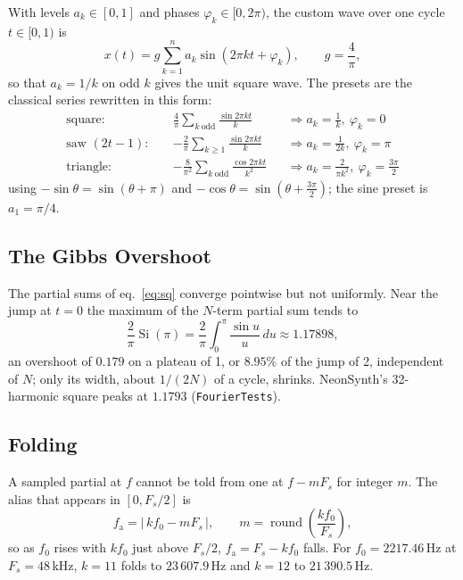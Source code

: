 \documentclass[11pt,letterpaper]{article}
\newcommand{\code}[1]{\texttt{\textcolor{codegray}{#1}}}
\begin{document}
With levels $a_k \in [0,1]$ and phases $\varphi_k \in [0, 2\pi)$, the custom wave over one cycle $t \in [0,1)$ is
\begin{equation}\label{eq:series}
  x(t) = g \sum_{k=1}^{n} a_k \sin(2\pi k t + \varphi_k), \qquad g = \frac{4}{\pi},
\end{equation}
so that $a_k = 1/k$ on odd $k$ gives the unit square wave. The presets are the classical series rewritten in this form:
\begin{align}
  \text{square:}\quad & \frac{4}{\pi}\sum_{k\ \mathrm{odd}} \frac{\sin 2\pi k t}{k} &&\Rightarrow a_k = \frac{1}{k},\ \varphi_k = 0 \label{eq:sq}\\
  \text{saw } (2t-1):\quad & -\frac{2}{\pi}\sum_{k\ge 1} \frac{\sin 2\pi k t}{k} &&\Rightarrow a_k = \frac{1}{2k},\ \varphi_k = \pi \label{eq:saw}\\
  \text{triangle:}\quad & -\frac{8}{\pi^2}\sum_{k\ \mathrm{odd}} \frac{\cos 2\pi k t}{k^2} &&\Rightarrow a_k = \frac{2}{\pi k^2},\ \varphi_k = \tfrac{3\pi}{2} \label{eq:tri}
\end{align}
using $-\sin\theta = \sin(\theta+\pi)$ and $-\cos\theta = \sin(\theta + \tfrac{3\pi}{2})$; the sine preset is $a_1 = \pi/4$.

\subsection{The Gibbs Overshoot}

The partial sums of eq.~\eqref{eq:sq} converge pointwise but not uniformly. Near the jump at $t=0$ the maximum of the
$N$-term partial sum tends to
\begin{equation}\label{eq:gibbs}
  \frac{2}{\pi}\operatorname{Si}(\pi) = \frac{2}{\pi}\int_0^{\pi} \frac{\sin u}{u}\,du \approx 1.17898,
\end{equation}
an overshoot of $0.179$ on a plateau of 1, or $8.95\%$ of the jump of 2, independent of $N$; only its width, about $1/(2N)$
of a cycle, shrinks. NeonSynth's 32-harmonic square peaks at $1.1793$ (\code{FourierTests}).

\subsection{Folding}

A sampled partial at $f$ cannot be told from one at $f - mF_s$ for integer $m$. The alias that appears in $[0, F_s/2]$ is
\begin{equation}\label{eq:fold}
  f_{\mathrm{a}} = \bigl|\,k f_0 - m F_s\,\bigr|, \qquad m = \operatorname{round}\!\left(\frac{k f_0}{F_s}\right),
\end{equation}
so as $f_0$ rises with $k f_0$ just above $F_s/2$, $f_{\mathrm{a}} = F_s - k f_0$ falls. For $f_0 = 2217.46$\,Hz at $F_s = 48$\,kHz,
$k = 11$ folds to $23\,607.9$\,Hz and $k = 12$ to $21\,390.5$\,Hz.
\end{document}
